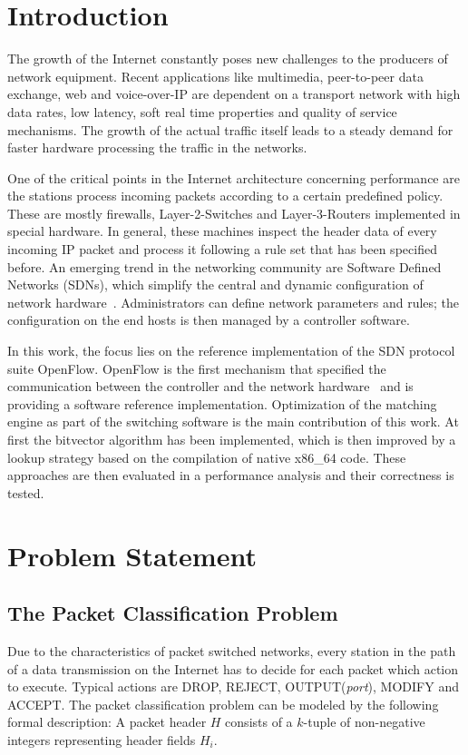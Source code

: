 \documentclass[conference]{IEEEtran}
\begin{document}
\section{Introduction}
\label{sec:intro}
The growth of the Internet constantly poses new challenges to the producers of network equipment.
Recent applications like multimedia, peer-to-peer data exchange, web and voice-over-IP are dependent on a transport network with
high data rates, low latency, soft real time properties and quality of service mechanisms.
The growth of the actual traffic itself leads to a steady demand for faster hardware processing the traffic in the networks.

One of the critical points in the Internet architecture concerning performance 
are the stations process incoming packets according to a certain predefined policy.
These are mostly firewalls, Layer-2-Switches and Layer-3-Routers implemented in special hardware.
In general, these machines inspect the header data of every incoming IP packet and process it 
following a rule set that has been specified before.
An emerging trend in the networking community are Software Defined Networks (SDNs),
which simplify the central and dynamic configuration of network hardware~\cite{onf_whitepaper}.
Administrators can define network parameters and rules; the configuration 
on the end hosts is then managed by a controller software.

In this work, the focus lies on the reference implementation of the SDN protocol suite OpenFlow.
OpenFlow is the first mechanism that specified the communication between 
the controller and the network hardware~\cite{onf_whitepaper}
and is providing a software reference implementation.
Optimization of the matching engine as part of the switching software is the main contribution of this work.
At first the bitvector algorithm has been implemented, which is then improved by a lookup strategy
based on the compilation of native x86\_64 code.
These approaches are then evaluated in a performance analysis and their correctness is tested.

\section{Problem Statement}
\subsection{The Packet Classification Problem}
Due to the characteristics of packet switched networks, every station in the path of a data transmission on the Internet 
has to decide for each packet which action to execute.
Typical actions are DROP, REJECT, OUTPUT(\textit{port}), MODIFY and ACCEPT.
The packet classification problem can be modeled by the following formal description:
A packet header $H$ consists of a $k$-tuple of non-negative integers representing header fields $H_i$.
\end{document}
